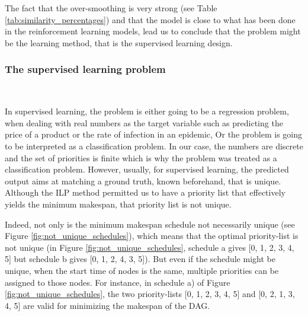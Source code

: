 The fact that the over-smoothing is very strong (see Table \ref{tab:similarity_percentages})
and that the model is close to what has been done in the reinforcement learning models\cite{Lee2021GlobalDagSchedDRL}\cite{Zhao2024GATDRLmodel},
lead us to conclude that the problem might be the learning method, 
that is the supervised learning design.

\subsubsection{The supervised learning problem}
~

In supervised learning, the problem is either going to be a
regression problem, when dealing with real numbers as the target variable
such as predicting the price of a product or the rate of infection in an epidemic,
Or the problem is going to be interpreted as a classification problem.
In our case, the numbers are discrete and the set of priorities is finite
which is why the problem was treated as a classification problem.
However, usually, for supervised learning, the predicted output 
aims at matching a ground truth, known beforehand, that is unique.
Although the ILP method permitted us to have a priority list that
effectively yields the minimum makespan,
that priority list is not unique.

Indeed, not only is the minimum makespan schedule not necessarily unique
(see Figure \ref{fig:not_unique_schedules}),
which means that the optimal priority-list is not unique
(in Figure \ref{fig:not_unique_schedules}, schedule a gives 
[0, 1, 2, 3, 4, 5] but schedule b gives [0, 1, 2, 4, 3, 5]).
But even if the schedule might be unique, when the start time
of nodes is the same, multiple priorities
can be assigned to those nodes.
For instance, in schedule a) of Figure \ref{fig:not_unique_schedules},
the  two priority-lists [0, 1, 2, 3, 4, 5] and [0, 2, 1, 3, 4, 5]
are valid for minimizing the makespan of the DAG.

